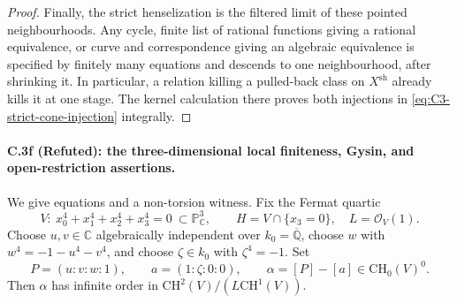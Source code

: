 \begin{proof}
Finally, the strict henselization is the filtered limit of these
pointed neighbourhoods. Any cycle, finite list of rational functions
giving a rational equivalence, or curve and correspondence giving an
algebraic equivalence is specified by finitely many equations and
descends to one neighbourhood, after shrinking it. In particular,
a relation killing a pulled-back class on $X^{\mathrm{sh}}$ already
kills it at one stage. The kernel calculation there proves both
injections in \eqref{eq:C3-strict-cone-injection} integrally.
\end{proof}

\paragraph{C.3f (Refuted): the three-dimensional local finiteness,
Gysin, and open-restriction assertions.}
We give equations and a non-torsion witness. Fix the Fermat quartic
\[
 V:\ x_0^4+x_1^4+x_2^4+x_3^4=0\ \subset\mathbb P^3_{\mathbb C},
 \qquad H=V\cap\{x_3=0\},\quad L=\mathcal O_V(1).
\]
Choose $u,v\in\mathbb C$ algebraically independent over
$k_0=\overline{\mathbb Q}$, choose
$w$ with $w^4=-1-u^4-v^4$, and choose
$\zeta\in k_0$ with $\zeta^4=-1$. Set
\[
 P=(u:v:w:1),\qquad a=(1:\zeta:0:0),\qquad
                 \alpha=[P]-[a]\in\mathrm{CH}_0(V)^0.
\]
Then $\alpha$ has infinite order in
$\mathrm{CH}^2(V)/(L\mathrm{CH}^1(V))$.

